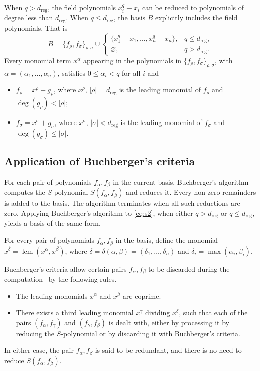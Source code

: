 \documentclass[a4paper, 12pt, oneside, openright]{article}
\DeclareMathOperator{\lcm}{lcm}
\begin{document}
When $q>d_{\mathrm{reg}}$, the field polynomials $x_i^q-x_i$ can be reduced to polynomials of degree less than $d_{\mathrm{reg}}$. When $q \le d_{\mathrm{reg}}$, the basis $B$ explicitly includes the field polynomials. That is
\begin{equation}\label{eq:s2}
B=\{f_\rho, f_\sigma\}_{\rho,\sigma}\cup 
\begin{cases}
\{x_1^q-x_1,\ldots,x_n^q-x_n\}, & q\le d_{\mathrm{reg}},\\
\varnothing, & q>d_{\mathrm{reg}}.
\end{cases}
\end{equation}
Every monomial term $x^{\alpha}$ appearing in the polynomials in $\{f_\rho, f_\sigma\}_{\rho,\sigma}$, with $\alpha=(\alpha_1,\ldots,\alpha_n)$, satisfies $0\le\alpha_i<q$ for all $i$ and 
\begin{itemize}
    \item $f_\rho =x^\rho  + g_\rho $, where $x^\rho,\, |\rho |=d_{\mathrm{reg}}$ is the leading monomial  of $f_\rho$ and $\deg(g_\rho )<|\rho |$;
    \item $f_\sigma=x^\sigma+g_\sigma$, where $x^\sigma,\,|\sigma|<d_{\mathrm{reg}}$ is the leading monomial of $f_\sigma$ and $\deg(g_\sigma)\le|\sigma|$.
\end{itemize}


\subsection{Application of Buchberger's criteria}\label{sec:criteria}
For each pair of polynomials $f_\alpha,f_\beta$ in the current basis, Buchberger's algorithm computes the $S$-polynomial $S(f_{\alpha},f_{\beta})$ and reduces it. Every non-zero remainders is added to the basis. The algorithm terminates when all such reductions are zero.
Applying Buchberger's algorithm to \eqref{eq:s2}, when either $q>d_{\mathrm{reg}}$ or $q\le d_{\mathrm{reg}}$,  yields a basis of the same form.

For every pair of polynomials $f_\alpha,f_\beta$ in the basis, define the monomial $x^\delta=\lcm(x^\alpha,x^\beta)$, where $\delta=\delta(\alpha,\beta)=(\delta_1,\dots,\delta_n)$ and $\delta_i=\max(\alpha_i,\beta_i).$

Buchberger's criteria allow certain pairs $f_\alpha,f_\beta$  to be discarded during the computation~\cite{B79, B85} by the following rules.
\begin{itemize}
    \item[(C1)] The leading monomials $x^\alpha$ and $x^\beta$ are coprime.
    \item[(C2)] There exists a third leading monomial $x^\gamma$ dividing $x^\delta$, such that each of the pairs $(f_\alpha,f_\gamma)$ and $(f_\gamma,f_\beta)$ is dealt with, either by processing it  by reducing the $S$-polynomial or by discarding it  with Buchberger's criteria.%
\end{itemize}
In either case, the pair $f_\alpha,f_\beta$ is said to be redundant, and there is no need to reduce $S(f_{\alpha},f_{\beta})$.
\end{document}
